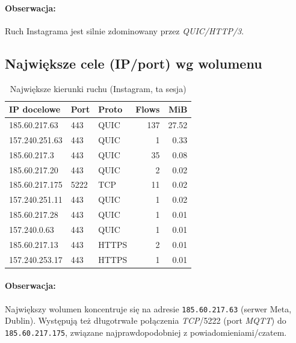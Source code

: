 \paragraph{Obserwacja:} 
Ruch Instagrama jest silnie zdominowany przez \emph{QUIC/HTTP/3}. 

\subsection{Największe cele (IP/port) wg wolumenu}
\begin{table}[H]
  \centering
  \caption{Największe kierunki ruchu (Instagram, ta sesja)}
  \label{tab:ig-topdst}
  \begin{tabular}{lllrr}
    \toprule
    \textbf{IP docelowe} & \textbf{Port} & \textbf{Proto} & \textbf{Flows} & \textbf{MiB} \\
    \midrule
    185.60.217.63   & 443 & QUIC  & 137 & 27.52 \\
    157.240.251.63  & 443 & QUIC  & 1   & 0.33 \\
    185.60.217.3    & 443 & QUIC  & 35  & 0.08 \\
    185.60.217.20   & 443 & QUIC  & 2   & 0.02 \\
    185.60.217.175  & 5222 & TCP  & 11  & 0.02 \\
    157.240.251.11  & 443 & QUIC  & 1   & 0.02 \\
    185.60.217.28   & 443 & QUIC  & 1   & 0.01 \\
    157.240.0.63    & 443 & QUIC  & 1   & 0.01 \\
    185.60.217.13   & 443 & HTTPS & 2   & 0.01 \\
    157.240.253.17  & 443 & HTTPS & 1   & 0.01 \\
    \bottomrule
  \end{tabular}
\end{table}

\paragraph{Obserwacja:}
Największy wolumen koncentruje się na adresie \texttt{185.60.217.63} (serwer Meta, Dublin). Występują też długotrwałe połączenia \emph{TCP}/5222 (port \emph{MQTT}) do \texttt{185.60.217.175}, związane najprawdopodobniej z powiadomieniami/czatem.

